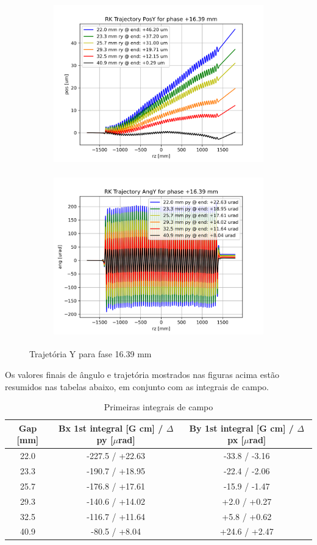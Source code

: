 \documentclass[a4paper,12pt]{article}
\begin{document}
\begin{figure}[H]
\begin{subfigure}{0.5\textwidth}
\includegraphics[width=0.9\linewidth, height=7cm]{figs/phase16 RK Posy.png} 
\label{fig:subim116ty}
\end{subfigure}
\begin{subfigure}{0.5\textwidth}
\includegraphics[width=0.9\linewidth, height=7cm]{figs/phase16 RK Angy.png}
\label{fig:subim216ty}
\end{subfigure}
\caption{Trajetória Y para fase 16.39 mm}
\label{fig:trajy_16}
\end{figure}

Os valores finais de ângulo e trajetória mostrados nas figuras acima estão resumidos nas tabelas abaixo, em conjunto com as integrais de campo.


\begin{table}[H]
\centering
\caption{Primeiras integrais de campo}
\begin{tabular}{|c|c|c|}
\hline
   Gap [mm] & Bx 1st integral [G cm] / $\Delta$ py [$\mu$rad] & By 1st integral [G cm] / $\Delta$ px [$\mu$rad] \\
\hline
    22.0 & -227.5 / +22.63 & -33.8 / -3.16 \\
    23.3 & -190.7 / +18.95 & -22.4 / -2.06 \\
    25.7 & -176.8 / +17.61 & -15.9 / -1.47 \\
    29.3 & -140.6 / +14.02 &  +2.0 / +0.27 \\
    32.5 & -116.7 / +11.64 &  +5.8 / +0.62 \\
    40.9 & -80.5 / +8.04 & +24.6 / +2.47 \\
\hline
\end{tabular}
\end{table}
\end{document}
